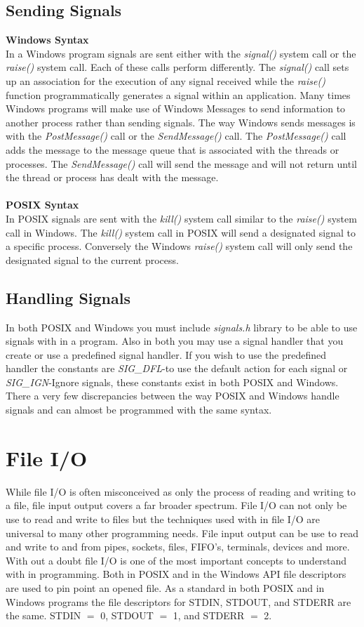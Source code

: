 \documentclass[letterpaper,10pt,notitlepage,fleqn]{article}
\begin{document}
\subsection{Sending Signals}
\textbf{Windows Syntax} \\
In a Windows program signals are sent either with the \textit{signal()} system call or the \textit{raise()} system call. Each of these calls perform differently. The \textit{signal()} call sets up an association for the execution of any signal received while the \textit{raise()} function programmatically generates a signal within an application. Many times Windows programs will make use of Windows Messages to send information to another process rather than sending signals. The way Windows sends messages is with the \textit{PostMessage()} call or the \textit{SendMessage()} call. The \textit{PostMessage()} call adds the message to the message queue that is associated with the threads or processes. The \textit{SendMessage()} call will send the message and will not return until the thread or process has dealt with the message. \\ \\
\textbf{POSIX Syntax} \\
In POSIX signals are sent with the \textit{kill()} system call similar to the \textit{raise()} system call in Windows. The \textit{kill()} system call in POSIX will send a designated signal to a specific process. Conversely the Windows \textit{raise()} system call will only send the designated signal to the current process.

\subsection{Handling Signals}
In both POSIX and Windows you must include \textit{signals.h} library to be able to use signals with in a program. Also in both you may use a signal handler that you create or use a predefined signal handler. If you wish to use the predefined handler the constants are \emph{SIG\_DFL}-to use the default action for each signal or \emph{SIG\_IGN}-Ignore signals, these constants exist in both POSIX and Windows. There a very few discrepancies between the way POSIX and Windows handle signals and can almost be programmed with the same syntax. 

\section{File I/O}
While file I/O is often misconceived as only the process of reading and writing to a file, file input output covers a far broader spectrum. File I/O can not only be use to read and write to files but the techniques used with in file I/O are universal to many other programming needs. File input output can be use to read and write to and from pipes, sockets, files, FIFO's, terminals, devices and more. With out a doubt file I/O is one of the most important concepts to understand with in programming. Both in POSIX and in the Windows API file descriptors are used to pin point an opened file. As a standard in both POSIX and in Windows programs the file descriptors for STDIN, STDOUT, and STDERR are the same. STDIN $=$ 0, STDOUT $=$ 1, and STDERR $=$ 2. 
\end{document}
